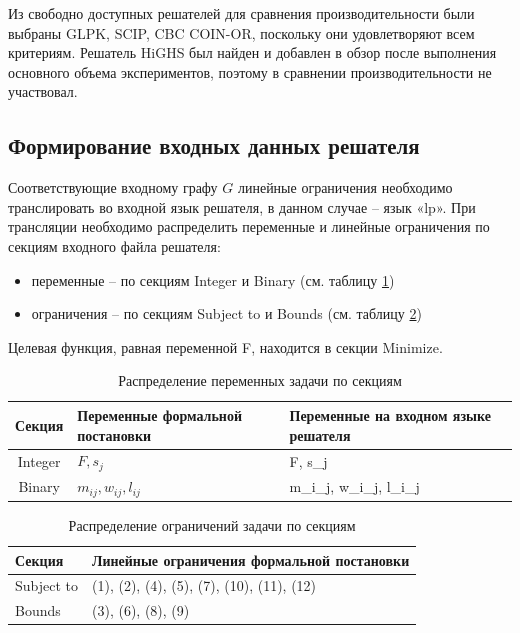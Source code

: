 Из свободно доступных решателей для сравнения производительности были выбраны GLPK, SCIP, CBC COIN-OR, поскольку они удовлетворяют всем критериям. Решатель HiGHS был найден и добавлен в обзор после выполнения основного объема экспериментов, поэтому в сравнении производительности не участвовал.


\subsection{Формирование входных данных решателя}\label{sec:input_generation}

Соответствующие входному графу $G$ линейные ограничения необходимо
транслировать во входной язык решателя, в данном случае -- язык «lp». При трансляции необходимо
распределить переменные и линейные ограничения по секциям входного
файла решателя:

\begin{itemize}
    \item переменные -- по секциям Integer и Binary (см. таблицу \ref{tab:variable_distribution})

    \item ограничения -- по секциям Subject to и Bounds (см. таблицу \ref{tab:restrictions_distribution})
\end{itemize}

Целевая функция, равная переменной F, находится в секции Minimize.

\begin{table}[h]
    \caption{Распределение переменных задачи по секциям}
    \centering
    \begin{tabular}{|c|>{\centering\arraybackslash}p{6.5cm}|>{\centering\arraybackslash}p{6.5cm}|}
    \hline
    \textbf{Секция} & \textbf{Переменные формальной постановки} & \textbf{Переменные на входном языке решателя} \\ 
    \hline
    Integer & $F, s_j$ & F, s\_j \\ 
    \hline
    Binary & $m_{ij}, w_{ij}, l_{ij}$ & m\_i\_j, w\_i\_j, l\_i\_j \\ 
    \hline
    \end{tabular}
    \label{tab:variable_distribution}
\end{table}


\begin{table}[h]
    \caption{Распределение ограничений задачи по секциям}
    \centering
    \begin{tabular}{|l|l|}
    \hline
    \textbf{Секция} & \textbf{Линейные ограничения формальной постановки} \\ 
    \hline
    Subject to & (1), (2), (4), (5), (7), (10), (11), (12) \\ 
    \hline
    Bounds & (3), (6), (8), (9) \\ 
    \hline
    \end{tabular}
    \label{tab:restrictions_distribution}
\end{table}



